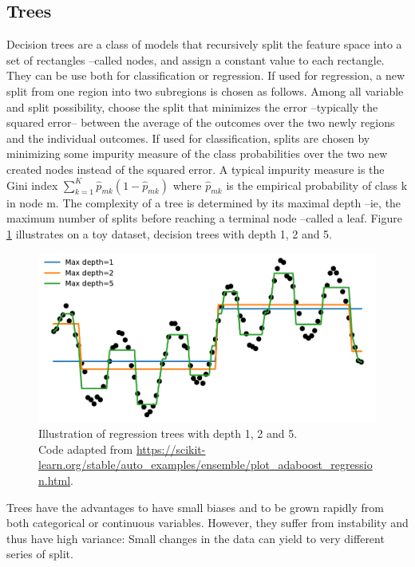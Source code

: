 \documentclass[french,12pt,twoside,a4paper]{book}
\begin{document}
\begin{appendices}
  \subsection{Trees}\label{apd:intro:trees}

  Decision trees are a class of models that recursively split the feature space
  into a set of rectangles --called nodes, and assign a constant value to each
  rectangle. They can be use both for classification or regression. If used for
  regression, a new split from one region into two subregions is chosen as
  follows. Among all variable and split possibility, choose the split that
  minimizes the error --typically the squared error-- between the average of the
  outcomes over the two newly regions and the individual outcomes. If used for
  classification, splits are chosen by minimizing some impurity measure of the
  class probabilities over the two new created nodes instead of the squared
  error. A typical impurity measure is the Gini index $\sum_{k=1}^K \hat p_{mk}
    (1-\hat p_{mk})$ where $\hat p_{mk}$ is the empirical probability of class k
  in node m. The complexity of a tree is determined by its maximal depth --ie,
  the maximum number of splits before reaching a terminal node --called a leaf.
  Figure \ref{fig:tree_regression} illustrates on a toy dataset, decision trees
  with depth 1, 2 and 5.

  \begin{figure}[!b]
    \centering
    \includegraphics[width=0.8\linewidth]{img/chapter_1/tree_3.pdf}
    \caption{Illustration of regression trees with depth 1, 2 and 5.\\Code
      adapted from
      \url{https://scikit-learn.org/stable/auto_examples/ensemble/plot_adaboost_regression.html}.}%
    \label{fig:tree_regression}
  \end{figure}

  Trees have the advantages to have small biases and to be grown rapidly from
  both categorical or continuous variables. However, they suffer from
  instability and thus have high variance: Small changes in the data can yield
  to very different series of split.


\end{appendices}
\end{document}
